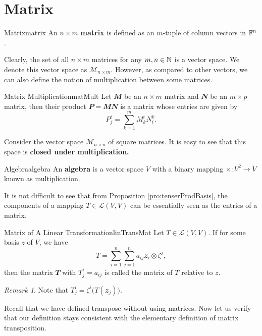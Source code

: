 \documentclass[math, code]{amznotes}
\theoremstyle{remark}
\newtheorem*{remark}{Remark}
\begin{document}
\section{Matrix}
\begin{dfnbox}{Matrix}{matrix}
    An $n \times m$ {\color{red} \textbf{matrix}} is defined as an $m$-tuple of column vectors in $\mathbb{F}^n$.
\end{dfnbox}
Clearly, the set of all $n \times m$ matrices for any $m, n \in \mathbb{N}$ is a vector space. We denote this vector space as $\mathcal{M}_{n \times m}$. However, as compared to other vectors, we can also define the notion of multiplication between some matrices.
\begin{dfnbox}{Matrix Multiplication}{matMult}
    Let $\mathbfit{M}$ be an $n \times m$ matrix and $\mathbfit{N}$ be an $m \times p$ matrix, then their product $\mathbfit{P = MN}$ is a matrix whose entries are given by
    \begin{equation*}
        P^i_j = \sum_{k = 1}^{m}M^i_kN^k_i.
    \end{equation*}
\end{dfnbox}
Consider the vector space $\mathcal{M}_{n \times n}$ of square matrices. It is easy to see that this space is \textbf{closed under multiplication.} 
\begin{dfnbox}{Algebra}{algebra}
    An {\color{red} \textbf{algebra}} is a vector space $V$ with a binary mapping $\times \colon V^2 \to V$ known as multiplication.
\end{dfnbox}
It is not difficult to see that from Proposition \ref{pro:tenserProdBasis}, the components of a mapping $T \in \mathcal{L}(V, V)$ can be essentially seen as the entries of a matrix.
\begin{dfnbox}{Matrix of A Linear Transformation}{linTransMat}
    Let $T \in \mathcal{L}(V, V)$. If for some basis $z$ of $V$, we have
    \begin{equation*}
        T = \sum_{i = 1}^{n}\sum_{j = 1}^{n}a_{ij}\mathbfit{z}_i \otimes \zeta^j,
    \end{equation*}
    then the matrix $\mathbfit{T}$ with $T^i_j = a_{ij}$ is called the matrix of $T$ relative to $z$.
\end{dfnbox}
\begin{notebox}
    \begin{remark}
        Note that $T^i_j = \zeta^i\bigl(T(\mathbfit{z}_j)\bigr)$.
    \end{remark}
\end{notebox}
Recall that we have defined transpose without using matrices. Now let us verify that our definition stays consistent with the elementary definition of matrix transposition.
\end{document}
